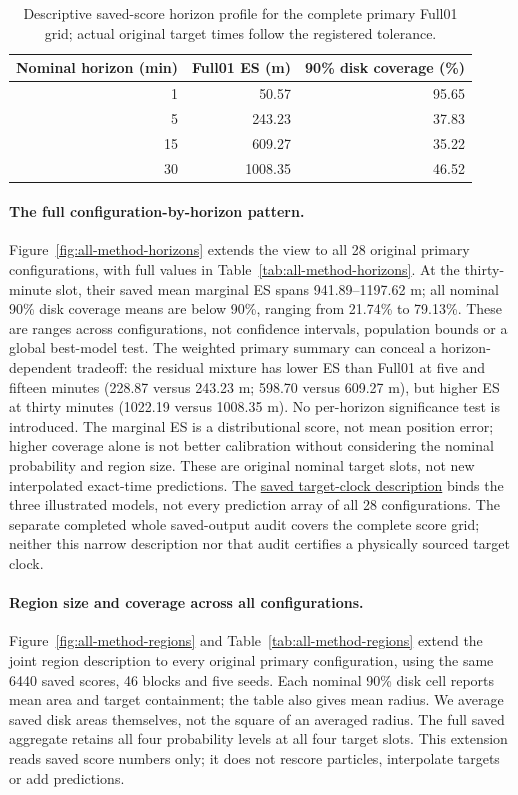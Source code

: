 \documentclass[11pt]{article}
\begin{document}
\begin{table}[htbp]
\centering
\small
\caption{Descriptive saved-score horizon profile for the complete primary
Full01 grid; actual original target times follow the registered tolerance.}
\label{tab:preliminary-coverage}
\begin{tabular}{@{}rrr@{}}
\toprule
Nominal horizon (min) & Full01 ES (m) & 90\% disk coverage (\%)\\
\midrule
1 & 50.57 & 95.65\\
5 & 243.23 & 37.83\\
15 & 609.27 & 35.22\\
30 & 1008.35 & 46.52\\
\bottomrule
\end{tabular}
\end{table}

\paragraph{The full configuration-by-horizon pattern.}
Figure~\ref{fig:all-method-horizons} extends the view to all 28 original
primary configurations, with full values in Table~\ref{tab:all-method-horizons}.
At the thirty-minute slot, their saved mean marginal ES spans 941.89--1197.62 m;
all nominal 90\% disk coverage means are below 90\%, ranging from
21.74\% to 79.13\%. These are ranges across configurations, not confidence
intervals, population bounds or a global best-model test.
The weighted primary summary can conceal a horizon-dependent tradeoff:
the residual mixture has lower ES than Full01 at five and fifteen minutes
(228.87 versus 243.23 m; 598.70 versus 609.27 m), but higher ES at thirty
minutes (1022.19 versus 1008.35 m). No per-horizon significance test is
introduced. The marginal ES is a distributional score, not mean position
error; higher coverage alone is not better calibration without considering
the nominal probability and region size.
These are original nominal target slots, not new interpolated exact-time
predictions. The \hyperref[sec:target-times]{saved target-clock description}
binds the three illustrated models,
not every prediction array of all 28 configurations. The separate completed
whole saved-output audit covers the complete score grid; neither this narrow
description nor that audit certifies a physically sourced target clock.


\FloatBarrier
\paragraph{Region size and coverage across all configurations.}
Figure~\ref{fig:all-method-regions} and Table~\ref{tab:all-method-regions}
extend the joint region description to every original primary configuration,
using the same 6440 saved scores, 46 blocks and five seeds. Each nominal
90\% disk cell reports mean area and target containment; the table also gives
mean radius. We average saved disk areas themselves, not the square of an
averaged radius. The full saved aggregate retains all four probability levels
at all four target slots. This extension reads saved score numbers only;
it does not rescore particles, interpolate targets or add predictions.
\end{document}
